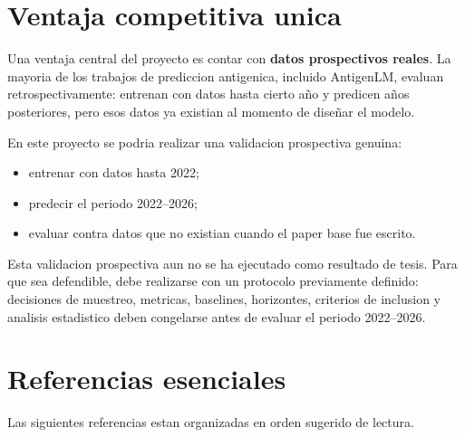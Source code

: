 \documentclass[12pt,letterpaper]{article}
\begin{document}
\section{Ventaja competitiva unica}

Una ventaja central del proyecto es contar con \textbf{datos prospectivos reales}. La mayoria de los trabajos de prediccion antigenica, incluido AntigenLM, evaluan retrospectivamente: entrenan con datos hasta cierto año y predicen años posteriores, pero esos datos ya existian al momento de diseñar el modelo.

En este proyecto se podria realizar una validacion prospectiva genuina:

\begin{itemize}[leftmargin=2em]
    \item entrenar con datos hasta 2022;
    \item predecir el periodo 2022--2026;
    \item evaluar contra datos que no existian cuando el paper base fue escrito.
\end{itemize}

Esta validacion prospectiva aun no se ha ejecutado como resultado de tesis. Para que sea defendible, debe realizarse con un protocolo previamente definido: decisiones de muestreo, metricas, baselines, horizontes, criterios de inclusion y analisis estadistico deben congelarse antes de evaluar el periodo 2022--2026.

\section{Referencias esenciales}

Las siguientes referencias estan organizadas en orden sugerido de lectura.
\end{document}
